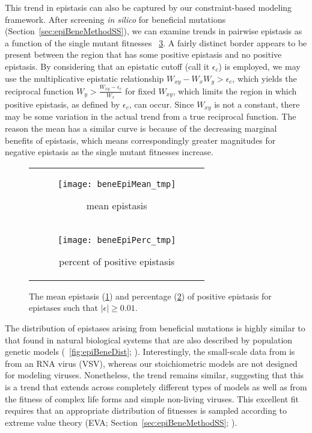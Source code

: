 This trend in epistasis can also be captured by our constraint-based
modeling framework. After screening \textit{in silico} for beneficial
mutations (Section~\ref{sec:epiBeneMethodSS}), we can examine trends in
pairwise epistasis as a function of the single mutant fitnesses 
\Fig~\ref{fig:beneEpiPairwise}. A fairly distinct border appears
to be present between the region that has some positive epistasis and
no positive epistasis. By considering that an epistatic cutoff (call
it $\epsilon_c$) is employed, we may use the multiplicative epistatic
relationship $W_{xy} - W_x W_y > \epsilon_c$, which yields the
reciprocal function $W_y > \frac{W_{xy} - \epsilon_c}{W_x}$ for fixed
$W_{xy}$, which limits the region in which positive epistasis, as
defined by $\epsilon_c$, can occur. Since $W_{xy}$ is not a constant,
there may be some variation in the actual trend from a true reciprocal
function. The reason the mean has a similar curve is because of the
decreasing marginal benefits of epistasis, which means correspondingly
greater magnitudes for negative epistasis as the single mutant
fitnesses increase.

\begin{figure}
\centering
\begin{tabular}{c}
\begin{subfigure}[b]{\textwidth}
  \texttt{[image: beneEpiMean\_tmp]}
  \caption{mean epistasis} 
  \label{fig:beneEpiPairwise:mean}
\end{subfigure}
\\
\begin{subfigure}[b]{\textwidth}
  \texttt{[image: beneEpiPerc\_tmp]}
  \caption{percent of positive epistasis}
  \label{fig:beneEpiPairwise:perc}
\end{subfigure}
\\
\end{tabular}
\caption{The mean epistasis (\ref{fig:beneEpiPairwise:mean}) and percentage
  (\ref{fig:beneEpiPairwise:perc}) of positive epistasis for epistases such
  that $\left|\epsilon\right| \ge 0.01$.}
\label{fig:beneEpiPairwise}
\end{figure}

The distribution of epistases arising from beneficial mutations is
highly similar to that found in natural biological systems that are
also described by population genetic models
(\Fig~\ref{fig:epiBeneDist}; \citep{Martin2007a}). Interestingly, the
small-scale data from \citet{Martin2007a} is from an RNA virus (VSV),
whereas our stoichiometric models are not designed for modeling
viruses. Nonetheless, the trend remains similar, suggesting that this
is a trend that extends across completely different types of models as
well as from the fitness of complex life forms and simple non-living
viruses. This excellent fit requires that an appropriate distribution
of fitnesses is sampled according to extreme value theory (EVA;
Section~\ref{sec:epiBeneMethodSS}; \citep{Orr2005, Orr2003}).


